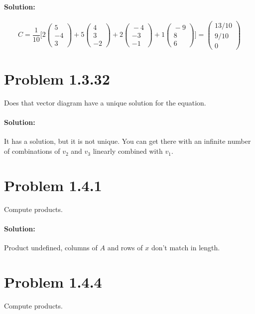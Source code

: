 \documentclass[11pt, notitlepage]{report}
\newenvironment{solution}{\paragraph{Solution:}}{\hfill}
\begin{document}
\begin{solution}

\[
C=\frac{1}{10}\bigg[
2\left(\begin{matrix}{}
  5\\
  -4\\
  3
\end{matrix}\right)
+
5\left(\begin{matrix}{}
  4\\
  3\\
  -2
\end{matrix}\right)
+
2\left(\begin{matrix}{}
  -4\\
  -3\\
  -1
\end{matrix}\right)
+
1\left(\begin{matrix}{}
  -9\\
  8\\
  6
\end{matrix}\right)
\bigg]
=
\left(\begin{matrix}{}
  13/10\\
  9/10\\
  0
\end{matrix}\right)
\]

\end{solution}

\section{Problem 1.3.32}
Does that vector diagram have a unique solution for the equation.
\begin{solution}
It has a solution, but it is not unique. You can get there with an infinite number of combinations of $v_2$ and $v_3$ linearly combined with $v_1$.
\end{solution}

\section{Problem 1.4.1}
Compute products.
\begin{solution} Product undefined, columns of $A$ and rows of $x$ don't match in length.
\end{solution}

\section{Problem 1.4.4}

Compute products.
\end{document}

